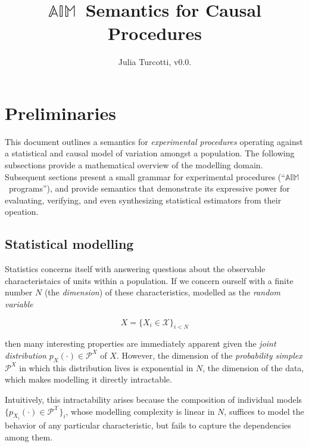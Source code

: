 \documentclass{article}
\begin{document}
\newcommand{\A}{\ensuremath{\mathbb{A}}}
\newcommand{\I}{\ensuremath{\mathbb{I}}}
\newcommand{\M}{\ensuremath{\mathbb{M}}}
\newcommand{\AIM}{\A\I\M~}


\title{\AIM Semantics for Causal Procedures}
\author{Julia Turcotti, v0.0.\vcounter}
\maketitle

\tableofcontents

\section{Preliminaries}

This document outlines a semantics for \textit{experimental procedures} operating against a statistical and causal model of variation amongst a population. The following subsections provide a mathematical overview of the modelling domain. Subsequent sections present a small grammar for experimental procedures (``\AIM programs''), and provide semantics that demonstrate its expressive power for evaluating, verifying, and even synthesizing statistical estimators from their opeation.

\subsection{Statistical modelling}

Statistics concerns itself with answering questions about the observable characteristaics of units within a population. If we concern ourself with a finite number $N$ (the \textit{dimension}) of these characteristics, modelled as the \textit{random variable}

\begin{equation*}
X = \{X_i \in \mathcal{X}\}_{i < N}
\end{equation*}

then many interesting properties are immediately apparent given the \textit{joint distribution} $p_X(\cdot) \in \mathcal{P}^X$ of $X$. However, the dimension of the \textit{probability simplex} $\mathcal{P}^X$ in which this distribution lives is exponential in $N$, the dimension of the data, which makes modelling it directly intractable.


Intuitively, this intractability arises because the composition of individual models $\{p_{X_i}(\cdot) \in \mathcal{P}^\mathcal{X}\}_i$, whose modelling complexity is linear in $N$, suffices to model the behavior of any particular characteristic, but fails to capture the dependencies among them.
\end{document}
